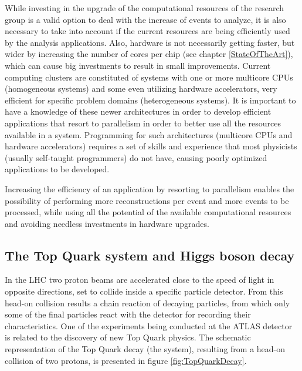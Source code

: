 While investing in the upgrade of the computational resources of the research group is a valid option to deal with the increase of events to analyze, it is also necessary to take into account if the current resources are being efficiently used by the analysis applications. Also, hardware is not necessarily getting faster, but wider by increasing the number of cores per chip (see chapter \ref{StateOfTheArt}), which can cause big investments to result in small improvements. Current computing clusters are constituted of systems with one or more multicore CPUs (homogeneous systems) and some even utilizing hardware accelerators, very efficient for specific problem domains (heterogeneous systems). It is important to have a knowledge of these newer architectures in order to develop efficient applications that resort to parallelism in order to better use all the resources available in a system. Programming for such architectures (multicore CPUs and hardware accelerators) requires a set of skills and experience that most physicists (usually self-taught programmers) do not have, causing poorly optimized applications to be developed.

Increasing the efficiency of an application by resorting to parallelism enables the possibility of performing more reconstructions per event and more events to be processed, while using all the potential of the available computational resources and avoiding needless investments in hardware upgrades.

\subsection{The Top Quark system and Higgs boson decay}
\label{TopQuarkSystem}

In the LHC two proton beams are accelerated close to the speed of light in opposite directions, set to collide inside a specific particle detector. From this head-on collision results a chain reaction of decaying particles, from which only some of the final particles react with the detector for recording their characteristics. One of the experiments being conducted at the ATLAS detector is related to the discovery of new Top Quark physics. The schematic representation of the Top Quark decay (the \ttbar system), resulting from a head-on collision of two protons, is presented in figure \ref{fig:TopQuarkDecay}.

